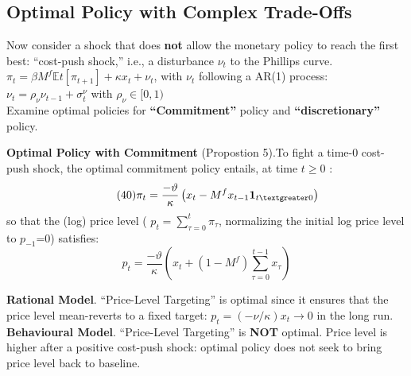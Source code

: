 \documentclass{beamer}
\begin{document}
\subsection{Optimal Policy with Complex Trade-Offs}

\begin{frame}{\subsecname}
    Now consider a shock that does \textbf{not} allow the monetary policy to reach the first best: “cost-push shock,” i.e., a disturbance $\nu_{t}$ to the Phillips curve.\\
    \hfill \linebreak
    $\pi_{t}=\beta M^{f} \mathbb{E}t\left[\pi_{t+1}\right]+\kappa x_{t}+\nu_{t}$, with $\nu_{t}$ following a AR(1) process: $\nu_{t}=\rho_{\nu}\nu_{t-1}+\sigma_{t}^{\nu}$ with $\rho_{\nu}\in[0,1)$\\
    \hfill \linebreak
    Examine optimal policies for \textbf{``Commitment''} policy and \textbf{``discretionary''} policy.
\end{frame}

\begin{frame}{\subsecname}
    \textbf{Optimal Policy with Commitment} (Propostion 5).To fight a time-0 cost-push shock, the optimal commitment policy entails, at time $t \geq 0$ :
    \begin{equation}\tag{40}
        \pi_{t}=\frac{-\vartheta}{\kappa}\left(x_{t}-M^{f}x_{t-1}\textbf{1}_{t\textgreater 0}\right)
    \end{equation}
    so that the (log) price level ( $p_{t}=\sum\limits_{\tau=0}^{t}\pi_{\tau}$, normalizing the initial log price level to $p_{-1}$=0) satisfies:
    \begin{equation}\tag{41}
        p_{t}=\frac{-\vartheta}{\kappa}\left(x_{t}+\left(1-M^{f}\right)\sum_{\tau=0}^{t-1}x_{\tau}\right)
    \end{equation}
\end{frame}

\begin{frame}{\subsecname}
    \textbf{Rational Model}. “Price-Level Targeting” is optimal since it ensures that the price level mean-reverts to a fixed target: $p_{t}=(-\nu/\kappa)x_{t}\to0$ in the long run.\\
    \hfill \linebreak    
    \textbf{Behavioural Model}. “Price-Level Targeting” is \textbf{NOT} optimal. Price level is higher after a positive cost-push shock: optimal policy does not seek to bring price level back to baseline.\\    
\end{frame}
\end{document}
